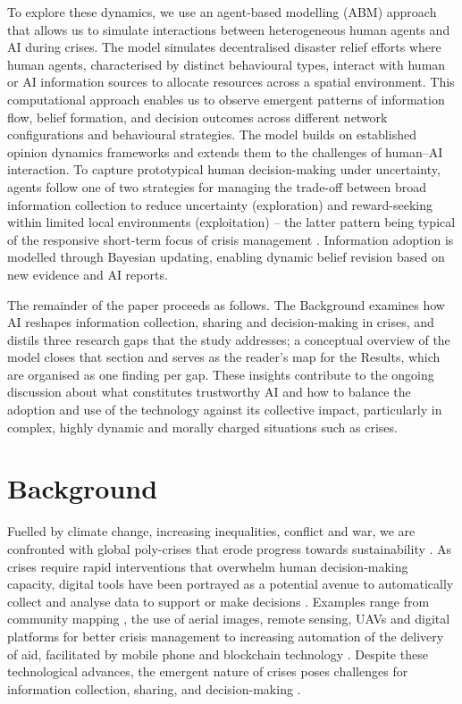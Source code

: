 \documentclass[sn-apacite]{sn-jnl}
\begin{document}
To explore these dynamics, we use an agent-based modelling (ABM) approach that allows us to simulate interactions between heterogeneous human agents and AI during crises. The model simulates decentralised disaster relief efforts where human agents, characterised by distinct behavioural types, interact with human or AI information sources to allocate resources across a spatial environment. This computational approach enables us to observe emergent patterns of information flow, belief formation, and decision outcomes across different network configurations and behavioural strategies. The model builds on established opinion dynamics frameworks \citep{deffuant2000mixing,hegselmann2002opinion} %
and extends them to the challenges of human--AI interaction. To capture prototypical human decision-making under uncertainty, agents follow one of two strategies for managing the trade-off between broad information collection to reduce uncertainty (exploration) and reward-seeking within limited local environments (exploitation) -- the latter pattern being typical of the responsive short-term focus of crisis management \citep{comes2020coordination,march1991exploration}. %
Information adoption is modelled through Bayesian updating, enabling dynamic belief revision based on new evidence and AI reports.

The remainder of the paper proceeds as follows. The Background examines how AI reshapes information collection, sharing and decision-making in crises, and distils three research gaps that the study addresses; a conceptual overview of the model closes that section and serves as the reader's map for the Results, which are organised as one finding per gap. These insights contribute to the ongoing discussion about what constitutes trustworthy AI and how to balance the adoption and use of the technology against its collective impact, particularly in complex, highly dynamic and morally charged situations such as crises.

\section{Background}\label{sec:background}

Fuelled by climate change, increasing inequalities, conflict and war, we are confronted with global poly-crises that erode progress towards sustainability \citep{sogaard2024evolution}. %
As crises require rapid interventions that overwhelm human decision-making capacity, digital tools have been portrayed as a potential avenue to automatically collect and analyse data to support or make decisions \citep{qadir2016crisis}. %
Examples range from community mapping \citep{champlin2023measuring,soden2014crowdsourced}, the use of aerial images, remote sensing, UAVs and digital platforms for better crisis management \citep{voigt2007satellite} to increasing automation of the delivery of aid, facilitated by mobile phone and blockchain technology \citep{baharmand2019leveraging,coughlan2015forecast}. %
Despite these technological advances, the emergent nature of crises poses challenges for information collection, sharing, and decision-making \citep{nespeca2020towards,turoff2004design}. %
\end{document}
